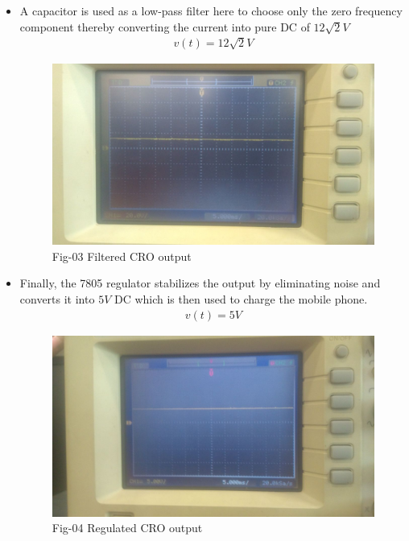 \documentclass[journal,12pt,twocolumn]{IEEEtran}
\numberwithin{figure}{section}
\begin{document}
\begin{itemize}
	\item A capacitor is used as a low-pass filter here to choose only the zero frequency component thereby converting the current into pure DC of $12\sqrt{2}V$
	\begin{align}
		v(t) = 12\sqrt{2}V
	\end{align}
	\begin{figure}[!ht]
		\centering
		\includegraphics[width=\columnwidth]{./figs/filter.jpg}
		\caption*{Fig-03 Filtered CRO output}
		\label{fig-filter}	
	\end{figure}
	
	\item Finally, the 7805 regulator stabilizes the output by eliminating noise and converts it into $5 V$ DC which is then used to charge the mobile phone.
	\begin{align}
		v(t) = 5 V 
	\end{align}
	\begin{figure}[!ht]
		\centering
		\includegraphics[width=\columnwidth]{./figs/regulator.jpg}
		\caption*{Fig-04 Regulated CRO output}
		\label{fig-regulator}	
	\end{figure}
	\end{itemize}
	
\end{document}
